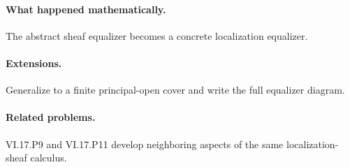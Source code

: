 \paragraph{What happened mathematically.}
The abstract sheaf equalizer becomes a concrete localization equalizer.

\paragraph{Extensions.}
Generalize to a finite principal-open cover and write the full equalizer diagram.

\paragraph{Related problems.}
VI.17.P9 and VI.17.P11 develop neighboring aspects of the same localization-sheaf calculus.
\fi
